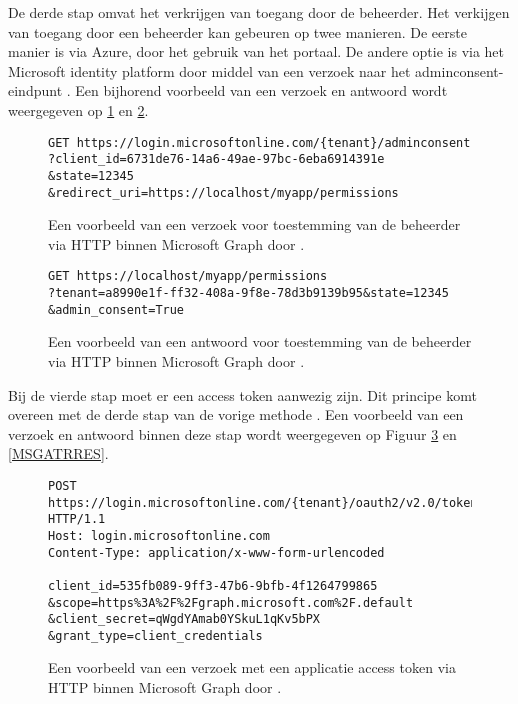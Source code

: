 De derde stap omvat het verkrijgen van toegang door de beheerder. Het verkijgen van toegang door een beheerder kan gebeuren op twee manieren. De eerste manier is via Azure, door het gebruik van het portaal. De andere optie is via het Microsoft identity platform door middel van een verzoek naar het adminconsent-eindpunt \autocite{Microsoft2023s}. Een bijhorend voorbeeld van een verzoek en antwoord wordt weergegeven op \ref{MSGRAR} en \ref{MSGRARES}. \\

\begin{figure}[!h]
    \scriptsize
    \begin{verbatim}
GET https://login.microsoftonline.com/{tenant}/adminconsent
?client_id=6731de76-14a6-49ae-97bc-6eba6914391e
&state=12345
&redirect_uri=https://localhost/myapp/permissions
    \end{verbatim}    
    \caption[Voorbeeld Adminconsent request Microsoft Graph]{Een voorbeeld van een verzoek voor toestemming van de beheerder via \ac{HTTP} binnen Microsoft Graph door \textcite{Microsoft2023s}.}
    \label{MSGRAR}
\end{figure}

\begin{figure}[!h]
    \scriptsize
    \begin{verbatim}
GET https://localhost/myapp/permissions
?tenant=a8990e1f-ff32-408a-9f8e-78d3b9139b95&state=12345
&admin_consent=True
    \end{verbatim}    
    \caption[Voorbeeld Adminconsent respons Microsoft Graph]{Een voorbeeld van een antwoord voor toestemming van de beheerder via \ac{HTTP} binnen Microsoft Graph door \textcite{Microsoft2023s}.}
    \label{MSGRARES}
\end{figure}

Bij de vierde stap moet er een access token aanwezig zijn. Dit principe komt overeen met de derde stap van de vorige methode \autocite{Microsoft2023s}. Een voorbeeld van een verzoek en antwoord binnen deze stap wordt weergegeven op Figuur \ref{MSGATRR} en \ref{MSGATRRES}. \\

\begin{figure}[!h]
    \scriptsize
    \begin{verbatim}
POST https://login.microsoftonline.com/{tenant}/oauth2/v2.0/token HTTP/1.1
Host: login.microsoftonline.com
Content-Type: application/x-www-form-urlencoded

client_id=535fb089-9ff3-47b6-9bfb-4f1264799865
&scope=https%3A%2F%2Fgraph.microsoft.com%2F.default
&client_secret=qWgdYAmab0YSkuL1qKv5bPX
&grant_type=client_credentials 
    \end{verbatim}    
    \caption[Voorbeeld Application Token Request Microsoft Graph]{Een voorbeeld van een verzoek met een applicatie access token via \ac{HTTP} binnen Microsoft Graph door \textcite{Microsoft2023s}.}
    \label{MSGATRR}
\end{figure}

